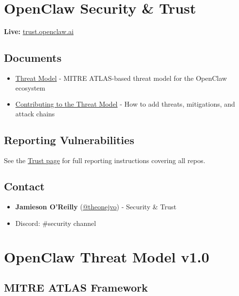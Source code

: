 \clearpage

\section{OpenClaw Security \& Trust}


\textbf{Live:} \href{https://trust.openclaw.ai}{trust.openclaw.ai}

\subsection{Documents}


\begin{itemize}
  \item \href{./THREAT-MODEL-ATLAS.md}{Threat Model} - MITRE ATLAS-based threat model for the OpenClaw ecosystem
  \item \href{./CONTRIBUTING-THREAT-MODEL.md}{Contributing to the Threat Model} - How to add threats, mitigations, and attack chains
\end{itemize}


\subsection{Reporting Vulnerabilities}


See the \href{https://trust.openclaw.ai}{Trust page} for full reporting instructions covering all repos.

\subsection{Contact}


\begin{itemize}
  \item \textbf{Jamieson O'Reilly} (\href{https://twitter.com/theonejvo}{@theonejvo}) - Security \& Trust
  \item Discord: \#security channel
\end{itemize}



\clearpage

\section{OpenClaw Threat Model v1.0}


\subsection{MITRE ATLAS Framework}


